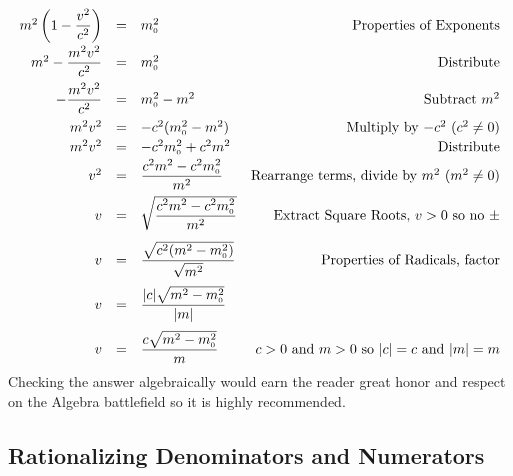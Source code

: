 \documentclass{ximera}
\begin{document}
{{{\begin{example}
\begin{enumerate}
\[\begin{array}{rclr}
m^2 \left(1 - \dfrac{v^2}{c^2}\right) & = &  m_{\text{\tiny$0$}}^{2} & \text{Properties of Exponents}\\[8pt]

m^2 - \dfrac{m^2 v^2}{c^2} & = & m_{\text{\tiny$0$}}^{2} & \text{Distribute} \\[8pt]

- \dfrac{m^2 v^2}{c^2} & = & m_{\text{\tiny$0$}}^{2} - m^2 & \text{Subtract $m^2$}  \\ [8pt]

m^2 v^2 & = & -c^2 (m_{\text{\tiny$0$}}^{2} - m^2)  & \text{Multiply by $-c^2$ ($c^2 \neq 0$)} \\ [2pt]

m^2 v^2 & = & -c^2m_{\text{\tiny$0$}}^{2} + c^2 m^2 & \text{Distribute} \\[2pt]

v^2  & = & \dfrac{c^2 m^2 -c^2m_{\text{\tiny$0$}}^{2}}{m^2} & \text{Rearrange terms, divide by $m^2$ ($m^2 \neq 0$)} \\[8pt]

v & = & \sqrt{\dfrac{c^2 m^2 -c^2m_{\text{\tiny$0$}}^{2}}{m^2}} & \text{Extract Square Roots, $v > 0$ so no $\pm$} \\[12pt]

v & = & \dfrac{\sqrt{c^2 (m^2 -m_{\text{\tiny$0$}}^{2})}}{\sqrt{m^2}} & \text{Properties of Radicals, factor} \\[12pt]

v & = & \dfrac{|c|\sqrt{m^2 -m_{\text{\tiny$0$}}^{2}}}{|m|} &  \\[12pt]

v & = & \dfrac{c\sqrt{m^2 -m_{\text{\tiny$0$}}^{2}}}{m} & \text{$c > 0$ and $m > 0$ so $|c| = c$ and $|m| = m$} \\

\end{array}\] Checking the answer algebraically would earn the reader great honor and respect on the Algebra battlefield so it is highly recommended.

\end{enumerate}

\end{example}

\subsection{Rationalizing Denominators and Numerators}
\label{rationalizingdenomandnumer}

}}}
\end{document}
